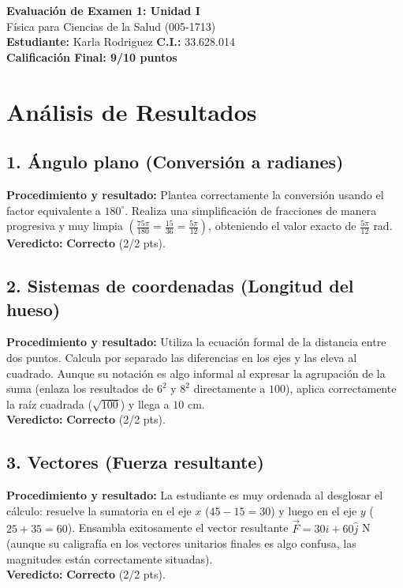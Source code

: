 \documentclass[12pt]{article}
\begin{document}
\begin{center}
    \Large \textbf{Evaluación de Examen 1: Unidad I} \\
    \large Física para Ciencias de la Salud (005-1713) \\
    \vspace{0.5cm}
    \textbf{Estudiante:} Karla Rodriguez \quad \textbf{C.I.:} 33.628.014
    \vspace{0.3cm} \\
    \large \textbf{Calificación Final: 9/10 puntos}
\end{center}

\vspace{0.5cm}

\section*{Análisis de Resultados}

\subsection*{1. Ángulo plano (Conversión a radianes)}
\textbf{Procedimiento y resultado:} Plantea correctamente la conversión usando el factor equivalente a $180^\circ$. Realiza una simplificación de fracciones de manera progresiva y muy limpia $\left(\frac{75\pi}{180} = \frac{15}{36} = \frac{5\pi}{12}\right)$, obteniendo el valor exacto de $\frac{5\pi}{12}$ rad. \\
\textbf{Veredicto:} \textbf{Correcto} (2/2 pts).

\subsection*{2. Sistemas de coordenadas (Longitud del hueso)}
\textbf{Procedimiento y resultado:} Utiliza la ecuación formal de la distancia entre dos puntos. Calcula por separado las diferencias en los ejes y las eleva al cuadrado. Aunque su notación es algo informal al expresar la agrupación de la suma (enlaza los resultados de $6^2$ y $8^2$ directamente a $100$), aplica correctamente la raíz cuadrada ($\sqrt{100}$) y llega a $10$ cm. \\
\textbf{Veredicto:} \textbf{Correcto} (2/2 pts).

\subsection*{3. Vectores (Fuerza resultante)}
\textbf{Procedimiento y resultado:} La estudiante es muy ordenada al desglosar el cálculo: resuelve la sumatoria en el eje $x$ ($45 - 15 = 30$) y luego en el eje $y$ ($25 + 35 = 60$). Ensambla exitosamente el vector resultante $\vec{F} = 30\hat{i} + 60\hat{j}$ N (aunque su caligrafía en los vectores unitarios finales es algo confusa, las magnitudes están correctamente situadas). \\
\textbf{Veredicto:} \textbf{Correcto} (2/2 pts).
\end{document}

